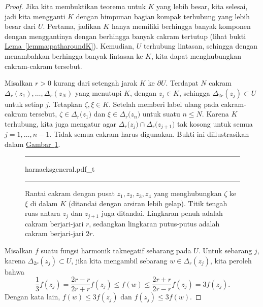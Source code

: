 \documentclass[12pt,openany]{book}
\theoremstyle{plain}
\theoremstyle{remark}
\theoremstyle{definition}
\newenvironment{myfig}{%
\begin{figure}[h!t]
\noindent\rule{\textwidth}{0.5pt}\vspace{12pt}\par\centering}%
{\par\noindent\rule{\textwidth}{0.5pt}
\end{figure}}
\theoremstyle{exercise}
\theoremstyle{example}
\newcommand{\figureref}[1]{\hyperref[#1]{Gambar~\ref*{#1}}}
\newcommand{\lemmaref}[1]{\hyperref[#1]{Lema~\ref*{#1}}}
\begin{document}
\begin{proof}
Jika kita membuktikan teorema untuk $K$ yang lebih besar, kita selesai, jadi kita
mengganti $K$ dengan himpunan bagian kompak terhubung yang lebih besar dari $U$.
Pertama, jadikan $K$ hanya memiliki berhingga banyak komponen dengan menggantinya
dengan berhingga banyak cakram tertutup
(lihat bukti \lemmaref{lemma:patharoundK}).  Kemudian, $U$ terhubung lintasan,
sehingga dengan menambahkan berhingga banyak lintasan ke $K$, kita dapat menghubungkan
cakram-cakram tersebut.

Misalkan $r> 0$ kurang dari setengah jarak $K$ ke $\partial U$.
Terdapat $N$ cakram $\Delta_{r}(z_1),\ldots,\Delta_{r}(z_N)$ yang menutupi $K$,
dengan $z_j \in K$, sehingga $\Delta_{2r}(z_j) \subset U$ untuk setiap $j$.
Tetapkan $\zeta,\xi \in K$.  Setelah memberi label ulang pada cakram-cakram tersebut,
$\zeta \in \Delta_{r}\bigl(z_{1}\bigr)$
dan
$\xi \in \Delta_{r}\bigl(z_{n}\bigr)$ untuk suatu $n \leq N$.
Karena $K$ terhubung, kita juga mengatur agar
$\Delta_{r}\bigl(z_{j}\bigr) \cap \Delta_{r}\bigl(z_{j+1}\bigr)$
tak kosong untuk semua $j=1,\ldots,n-1$.
Tidak semua cakram harus digunakan.
Bukti ini diilustrasikan dalam \figureref{fig:harnacksgeneral}.

\begin{myfig}
{harnacksgeneral.pdf_t}
\caption{Rantai cakram dengan pusat $z_1,z_2,z_3,z_4$ yang menghubungkan
$\zeta$ ke $\xi$ di dalam $K$ (ditandai dengan arsiran lebih gelap).  Titik tengah ruas
antara $z_j$ dan $z_{j+1}$ juga ditandai.
Lingkaran penuh adalah cakram berjari-jari $r$, sedangkan
lingkaran putus-putus adalah cakram berjari-jari $2r$.\label{fig:harnacksgeneral}}
\end{myfig}

Misalkan $f$ suatu fungsi harmonik taknegatif sebarang pada $U$.
Untuk sebarang $j$, karena $\Delta_{2r}(z_j) \subset U$, jika kita mengambil sebarang $w \in
\Delta_r(z_j)$, kita peroleh bahwa 
\begin{equation*}
\frac{1}{3} f(z_j) = 
\frac{2r-r}{2r+r} f(z_j)
\leq
f(w)
\leq \frac{2r+r}{2r-r} f(z_j)
= 3 f(z_j) .
\end{equation*}
Dengan kata lain, $f(w) \leq 3 f(z_j)$ dan $f(z_j) \leq 3 f(w)$.


\end{proof}
\end{document}
